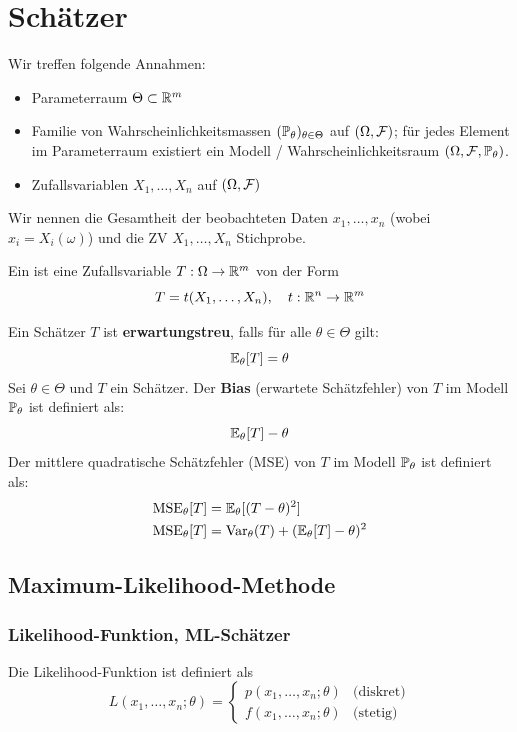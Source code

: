\section{Schätzer}

Wir treffen folgende Annahmen:
\begin{itemize}
	\item Parameterraum \(\Theta \subset \R^m\)
	\item Familie von Wahrscheinlichkeitsmassen \((\P_\theta)_{\theta \in \Theta}\) auf \((\Omega, \F)\); 
    für jedes Element im Parameterraum existiert ein Modell / Wahrscheinlichkeitsraum $(\Omega, \F, \P_{\theta})$.
	\item Zufallsvariablen \(X_1, \ldots, X_n\) auf \((\Omega, \F)\)
\end{itemize}
Wir nennen die Gesamtheit der beobachteten Daten \(x_1, \ldots, x_n\) (wobei $x_i = X_i(\omega)$) und die ZV \(X_1, \ldots, X_n\) Stichprobe.
\begin{mainbox}{}
	Ein  ist eine Zufallsvariable \(T: \Omega \to \R^m\) von der Form
	\[T = t(X_1, \ldots, X_n), \quad t: \R^n \to \R^m\]
\end{mainbox}
Ein Schätzer \(T\) ist \textbf{erwartungstreu}, falls für alle \(\theta \in \Theta\) gilt:
\[\E_\theta [T] = \theta\]
Sei \(\theta \in \Theta\) und \(T\) ein Schätzer. Der \textbf{Bias} (erwartete Schätzfehler) von \(T\) im Modell \(\P_\theta\) ist definiert als:
\[\E_\theta[T]-\theta\]
Der mittlere quadratische Schätzfehler (MSE) von \(T\) im Modell \(\P_\theta\) ist definiert als:
\begin{align*}
	\text{MSE}_\theta[T] & = \E_\theta[(T-\theta)^2]                    \\
	\text{MSE}_\theta[T] & = \Var_\theta(T) + (\E_\theta[T] - \theta)^2
\end{align*}

\subsection{Maximum-Likelihood-Methode}
\subsubsection{Likelihood-Funktion, ML-Schätzer}
Die Likelihood-Funktion ist definiert als
\[L(x_1, \ldots, x_n; \theta) = \begin{cases}
		p(x_1, \ldots, x_n; \theta) & \text{(diskret)} \\
		f(x_1, \ldots, x_n; \theta) & \text{(stetig)}
	\end{cases} \]

